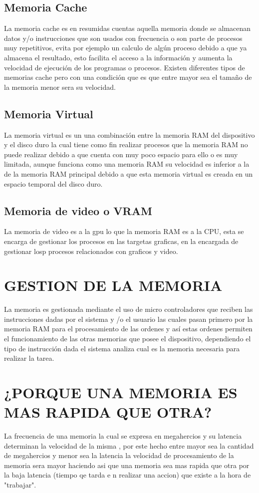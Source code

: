 \documentclass{article}
\begin{document}
{\subsection {Memoria Cache}
La memoria cache es en resumidas cuentas aquella memoria donde se almacenan datos y/o instrucciones que son usados con frecuencia o son parte de procesos muy repetitivos, evita por ejemplo un calculo de algún proceso debido a que ya almacena el resultado, esto facilita el acceso a la información y aumenta la velocidad de ejecución de los programas o procesos.
Existen diferentes tipos de memorias cache pero con una condición que es que entre mayor sea el tamaño de la memoria menor sera su velocidad.

\subsection{Memoria Virtual}
La memoria virtual es un una combinación entre la memoria RAM del dispositivo y el disco duro la cual tiene como fin realizar procesos que la memoria RAM no puede realizar debido a que cuenta con muy poco espacio para ello o es muy limitada, aunque funciona como una memoria RAM su velocidad es inferior a la de la memoria RAM principal debido a que esta memoria virtual es creada en un espacio temporal del disco duro. \cite{Virtual}

\subsection{Memoria de video o VRAM}
La memoria de video es a la gpu lo que la memoria RAM es a la CPU, esta se encarga de gestionar los procesos en las targetas graficas, en la encargada de gestionar losp procesos relacionados con graficos y video. \cite{Video}

\section{GESTION DE LA MEMORIA}
La memoria es gestionada mediante el uso de micro controladores que reciben las instrucciones dadas por el sistema y /o el usuario las cuales pasan primero por la memoria RAM para el procesamiento de las ordenes y así estas ordenes permiten el funcionamiento de las otras memorias que posee el dispositivo, dependiendo el tipo de instrucción dada el sistema analiza cual es la memoria necesaria para realizar la tarea. \cite{Augusto}

\section{¿PORQUE UNA MEMORIA ES MAS RAPIDA QUE OTRA?}
La  frecuencia  de una memoria la cual se expresa en megahercios y su latencia determinan la velocidad de la misma , por este hecho entre mayor sea la cantidad de megahercios y menor sea la latencia la velocidad de procesamiento de la memoria sera mayor haciendo asi que una memoria sea mas rapida que otra por la baja latencia (tiempo qe tarda e n realizar una accion) que existe a la hora de "trabajar".

}
\end{document}
